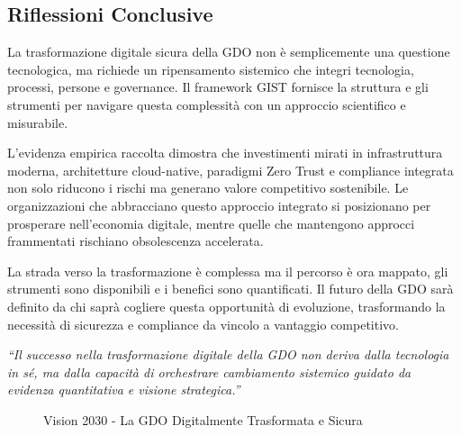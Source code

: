 \subsection{Riflessioni Conclusive}

La trasformazione digitale sicura della GDO non è semplicemente una questione tecnologica, ma richiede un ripensamento sistemico che integri tecnologia, processi, persone e governance. Il framework GIST fornisce la struttura e gli strumenti per navigare questa complessità con un approccio scientifico e misurabile.

L'evidenza empirica raccolta dimostra che investimenti mirati in infrastruttura moderna, architetture cloud-native, paradigmi Zero Trust e compliance integrata non solo riducono i rischi ma generano valore competitivo sostenibile. Le organizzazioni che abbracciano questo approccio integrato si posizionano per prosperare nell'economia digitale, mentre quelle che mantengono approcci frammentati rischiano obsolescenza accelerata.

La strada verso la trasformazione è complessa ma il percorso è ora mappato, gli strumenti sono disponibili e i benefici sono quantificati. Il futuro della GDO sarà definito da chi saprà cogliere questa opportunità di evoluzione, trasformando la necessità di sicurezza e compliance da vincolo a vantaggio competitivo.

\begin{center}
\textit{``Il successo nella trasformazione digitale della GDO non deriva dalla tecnologia in sé, ma dalla capacità di orchestrare cambiamento sistemico guidato da evidenza quantitativa e visione strategica.''}
\end{center}

\begin{figure}[H]
\centering
{}
\caption{Vision 2030 - La GDO Digitalmente Trasformata e Sicura}
\end{figure}
